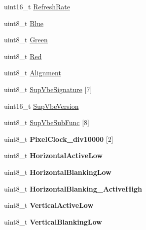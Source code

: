 \begin{DoxyCompactItemize}
\item 
uint16\+\_\+t \mbox{\hyperlink{structRTEMS__PACKED_a85be85f240ed4118097d2a329184c5b9}{Refresh\+Rate}}
\item 
uint8\+\_\+t \mbox{\hyperlink{structRTEMS__PACKED_a9bc36b6b4c855a85ffb848c4b09d1844}{Blue}}
\item 
uint8\+\_\+t \mbox{\hyperlink{structRTEMS__PACKED_a2b381d32efcaf07628dce488203561b1}{Green}}
\item 
uint8\+\_\+t \mbox{\hyperlink{structRTEMS__PACKED_aad838556d00f80ebdd295044d9f236be}{Red}}
\item 
uint8\+\_\+t \mbox{\hyperlink{structRTEMS__PACKED_afb33a0278bf739dbc7877d71ff87490f}{Alignment}}
\item 
uint8\+\_\+t \mbox{\hyperlink{structRTEMS__PACKED_a061010712e3ce51b83e5ee789a9b57f5}{Sup\+Vbe\+Signature}} \mbox{[}7\mbox{]}
\item 
uint16\+\_\+t \mbox{\hyperlink{structRTEMS__PACKED_aad2664badfc3d7a7dd41714cb4cd7697}{Sup\+Vbe\+Version}}
\item 
uint8\+\_\+t \mbox{\hyperlink{structRTEMS__PACKED_a3bcbe22b55d9e06a74a51b44019f2f67}{Sup\+Vbe\+Sub\+Func}} \mbox{[}8\mbox{]}
\item 
\mbox{\label{structRTEMS__PACKED_acc0d718ee0f6fb193e64141290a4de36}} 
uint8\+\_\+t {\bfseries Pixel\+Clock\+\_\+div10000} \mbox{[}2\mbox{]}
\item 
\mbox{\label{structRTEMS__PACKED_ac2d6a096d293281daa40c3c3dec065a4}} 
uint8\+\_\+t {\bfseries Horizontal\+Active\+Low}
\item 
\mbox{\label{structRTEMS__PACKED_ae21d06a335bd6a78ad24bd0c660c2c62}} 
uint8\+\_\+t {\bfseries Horizontal\+Blanking\+Low}
\item 
\mbox{\label{structRTEMS__PACKED_a3483acb6a3fc6b60f78eb8a30a9ba726}} 
uint8\+\_\+t {\bfseries Horizontal\+Blanking\+\_\+\+Active\+High}
\item 
\mbox{\label{structRTEMS__PACKED_a8f4095a771d375032ddfd04d480afb89}} 
uint8\+\_\+t {\bfseries Vertical\+Active\+Low}
\item 
\mbox{\label{structRTEMS__PACKED_a2ac9249864f9438ec84b72be8a314c5c}} 
uint8\+\_\+t {\bfseries Vertical\+Blanking\+Low}

\end{DoxyCompactItemize}
